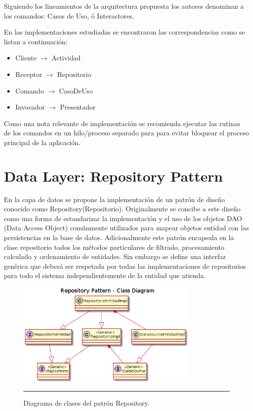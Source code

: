 Siguiendo los lineamientos de la arquitectura propuesta los autores denominan a los comandos: Casos de Uso, ó Interactores.

En las implementaciones estudiadas se encontraron las correspondencias como se listan a continuación:
\begin{itemize}
	\item Cliente $\rightarrow$ Actividad
	\item Receptor $\rightarrow$ Repositorio
	\item Comando $\rightarrow$ CasoDeUso
	\item Invocador $\rightarrow$ Presentador
\end{itemize}

Como una nota relevante de implementación se recomienda ejecutar las rutinas de los comandos en un hilo/proceso separado para para evitar bloquear el proceso principal de la aplicación.



\section{Data Layer: Repository Pattern}
En la capa de datos se propone la implementación de un patrón de diseño conocido como Repository(Repositorio). 
Originalmente se concibe a este diseño como una forma de estandarizar la implementación y el uso de los objetos DAO (Data Access Object) comúnmente utilizados para mapear objetos entidad con las persistencias en la base de datos.
Adicionalmente este patrón encapsula en la clase repositorio todos los métodos particulares de filtrado, procesamiento calculado y ordenamiento de entidades.
Sin embargo se define una interfaz genérica que deberá ser respetada por todas las implementaciones de repositorios para todo el sistema independientemente de la entidad que atienda.

\begin{figure}[htbp]
	\centering
	\includegraphics[width=0.8\textwidth]{Figures/uml_clases_repository.png}
	\rule{35em}{1pt}
	\caption[Repository Pattern Class Diagram]{Diagrama de clases del patrón Repository.}
	\label{fig:uml_clases_repository}
\end{figure}

